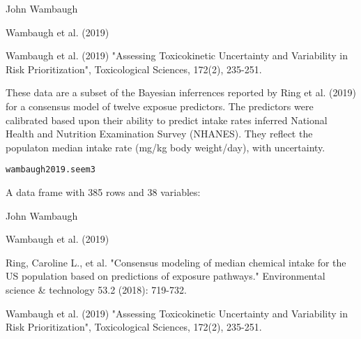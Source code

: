 \documentclass[a4paper]{book}
\begin{document}
%
\begin{Author}\relax
John Wambaugh
\end{Author}
%
\begin{Source}\relax
Wambaugh et al. (2019)
\end{Source}
%
\begin{References}\relax
Wambaugh et al. (2019) "Assessing Toxicokinetic Uncertainty and
Variability in Risk Prioritization", Toxicological Sciences, 172(2), 235-251.
\end{References}
%
\begin{Description}\relax
These data are a subset of the Bayesian inferrences reported by Ring et al.
(2019) for a consensus model of twelve exposue predictors. The predictors
were calibrated based upon their ability to predict intake rates inferred
National Health and Nutrition Examination Survey (NHANES). They reflect the
populaton median intake rate (mg/kg body weight/day), with uncertainty.
\end{Description}
%
\begin{Usage}
\begin{verbatim}
wambaugh2019.seem3
\end{verbatim}
\end{Usage}
%
\begin{Format}
A data frame with 385 rows and 38 variables:
\end{Format}
%
\begin{Author}\relax
John Wambaugh
\end{Author}
%
\begin{Source}\relax
Wambaugh et al. (2019)
\end{Source}
%
\begin{References}\relax
Ring, Caroline L., et al. "Consensus modeling of median chemical
intake for the US population based on predictions of exposure pathways."
Environmental science \& technology 53.2 (2018): 719-732.

Wambaugh et al. (2019) "Assessing Toxicokinetic Uncertainty and
Variability in Risk Prioritization", Toxicological Sciences, 172(2), 235-251.
\end{References}
%
\end{document}
